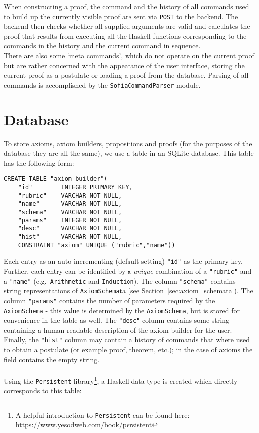 \documentclass[notitlepage]{report}
\newcommand\m[1]{\texttt{#1}}
\newcommand\ms[1]{\texttt{#1}}
\begin{document}
When constructing a proof, the command and the history of all commands used to
build up the currently visible proof are sent via \texttt{POST} to the backend.
The backend then checks whether all supplied arguments are valid and calculates
the proof that results from executing all the Haskell functions corresponding to
the commands in the history and the current command in sequence.
\\
There are also some `meta commands', which do not operate on the current proof
but are rather concerned with the appearance of the user interface, storing the
current proof as a postulate or loading a proof from the database. Parsing of
all commands is accomplished by the \m{SofiaCommandParser} module.

\section{Database}
To store axioms, axiom builders, propositions and proofs (for the purposes of
the database they are all the same), we use a table in an SQLite database. This
table has the following form:

\begin{verbatim}
CREATE TABLE "axiom_builder"(
    "id"        INTEGER PRIMARY KEY,
    "rubric"    VARCHAR NOT NULL,
    "name"      VARCHAR NOT NULL,
    "schema"    VARCHAR NOT NULL,
    "params"    INTEGER NOT NULL,
    "desc"      VARCHAR NOT NULL,
    "hist"      VARCHAR NOT NULL,
    CONSTRAINT "axiom" UNIQUE ("rubric","name"))
\end{verbatim}

Each entry as an auto-incrementing (default setting) \ms{"id"} as the primary
key. Further, each entry can be identified by a \emph{unique} combination of a
\ms{"rubric"} and a \ms{"name"} (e.g.\ \texttt{Arithmetic} and
\texttt{Induction}). The column \ms{"schema"} contains string representations of
\m{AxiomSchema}ta (see Section~\ref{sec:axiom_schemata}). The column
\ms{"params"} contains the number of parameters required by the \m{AxiomSchema}
- this value is determined by the \m{AxiomSchema}, but is stored for convenience
in the table as well. The \ms{"desc"} column contains some string containing a
human readable description of the axiom builder for the user. Finally, the
\ms{"hist"} column may contain a history of commands that where used to obtain a
postulate (or example proof, theorem, etc.); in the case of axioms the field
contains the empty string.\\\\
Using the \texttt{Persistent} library\footnote{A helpful introduction to
\texttt{Persistent} can be found here:
\url{https://www.yesodweb.com/book/persistent}}, a Haskell data type is created
which directly corresponds to this table:
\end{document}

